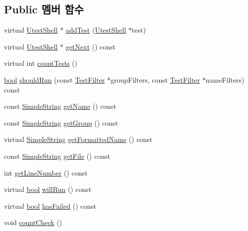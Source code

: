 \subsection*{Public 멤버 함수}
\begin{DoxyCompactItemize}
\item 
virtual \hyperlink{class_utest_shell}{Utest\+Shell} $\ast$ \hyperlink{class_utest_shell_a107d518376747143c07442a9e957b613}{add\+Test} (\hyperlink{class_utest_shell}{Utest\+Shell} $\ast$test)
\item 
virtual \hyperlink{class_utest_shell}{Utest\+Shell} $\ast$ \hyperlink{class_utest_shell_a1ac818ddaedf486843c68a5852de42ff}{get\+Next} () const 
\item 
virtual int \hyperlink{class_utest_shell_aabfe7889f5907ce121416805431c4866}{count\+Tests} ()
\item 
\hyperlink{avb__gptp_8h_af6a258d8f3ee5206d682d799316314b1}{bool} \hyperlink{class_utest_shell_aecee9fc54f1114c23fd48360855b8d46}{should\+Run} (const \hyperlink{class_test_filter}{Test\+Filter} $\ast$group\+Filters, const \hyperlink{class_test_filter}{Test\+Filter} $\ast$name\+Filters) const 
\item 
const \hyperlink{class_simple_string}{Simple\+String} \hyperlink{class_utest_shell_a454500e4f7023136a9a6a956323e3a77}{get\+Name} () const 
\item 
const \hyperlink{class_simple_string}{Simple\+String} \hyperlink{class_utest_shell_a9d203c5f3c7cb6d28b66189a20735dca}{get\+Group} () const 
\item 
virtual \hyperlink{class_simple_string}{Simple\+String} \hyperlink{class_utest_shell_af1b3219048ca8ae0e2bb935b813b4b92}{get\+Formatted\+Name} () const 
\item 
const \hyperlink{class_simple_string}{Simple\+String} \hyperlink{class_utest_shell_ac086867db63bc447ebef78844034d289}{get\+File} () const 
\item 
int \hyperlink{class_utest_shell_ae48a165945bebe01fd777069441e614e}{get\+Line\+Number} () const 
\item 
virtual \hyperlink{avb__gptp_8h_af6a258d8f3ee5206d682d799316314b1}{bool} \hyperlink{class_utest_shell_afa35d9bf0fd1c772b04f48d89d318a70}{will\+Run} () const 
\item 
virtual \hyperlink{avb__gptp_8h_af6a258d8f3ee5206d682d799316314b1}{bool} \hyperlink{class_utest_shell_ae4deec08ed507f9a2f1cced854fc5a16}{has\+Failed} () const 
\item 
void \hyperlink{class_utest_shell_a58577489a2418efb4c440761e533f2e7}{count\+Check} ()

\end{DoxyCompactItemize}
